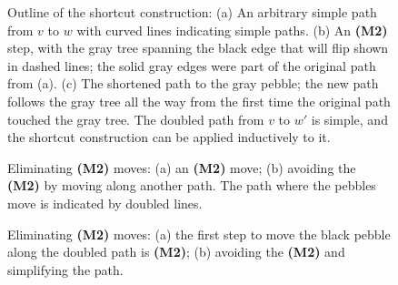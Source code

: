 \documentclass[11pt]{article}
\begin{document}
	\begin{figure}[htbp]
	\centering
	\hspace{.3in}
	\hspace{.3in}
	
	\caption{Outline of the shortcut construction: (a) An arbitrary simple path from $v$ to $w$ with
	curved lines indicating simple paths.
	(b) An {\bf (M2)} step, with the gray tree spanning the black edge that will flip shown in dashed
	lines; the solid gray edges were part of the original path from (a).  (c) The shortened path
	to the gray pebble; the new path follows the gray tree all the way from the first time the original
	path touched the gray tree.  The doubled path from $v$ to $w'$ is simple, and the shortcut construction
	can be applied inductively to it.}
	\label{fig.m2-meta-picture}
	\end{figure}
	
	\begin{figure}[htbp]
	\centering
	\hspace{.3in}
	
	\caption{Eliminating {\bf (M2)} moves: (a) an {\bf (M2)} move; (b) avoiding the 
	{\bf (M2)} by moving along another path.  The path where the pebbles move is indicated
	by doubled lines.}
	\label{fig.m2-move-eliminate}
	\end{figure}
	
	\begin{figure}[htbp]
	\centering
	\hspace{.3in}
	
	\caption{Eliminating {\bf (M2)} moves: (a) the first step to move the black pebble along the 
	doubled path is {\bf (M2)}; (b) avoiding the 
	{\bf (M2)} and simplifying the path.}
	\label{fig.m2-move-eliminate-2}
	\end{figure}
	
\end{document}
